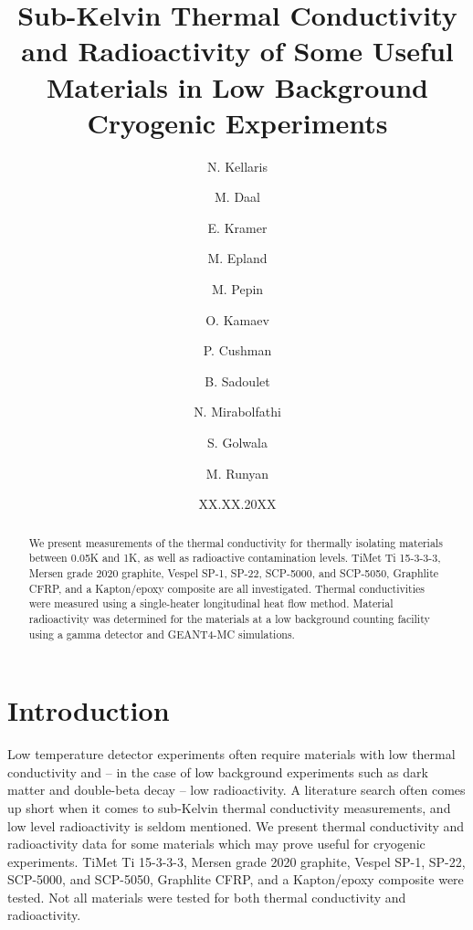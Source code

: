 \documentclass[final]{svjour2}
\begin{document}
\newcommand{\hdblarrow}{H\makebox[0.9ex][l]{$\downdownarrows$}-}
\title{Sub-Kelvin Thermal Conductivity and Radioactivity of Some Useful Materials in Low Background Cryogenic Experiments}

\author{N. Kellaris \and M. Daal \and E. Kramer \and M. Epland \and M. Pepin \and O. Kamaev \and P. Cushman \and B. Sadoulet \and N. Mirabolfathi \and S. Golwala \and M. Runyan}


\date{XX.XX.20XX}

\maketitle


\begin{abstract}
     We present measurements of the thermal conductivity for thermally isolating materials between 0.05K and 1K, as well as radioactive contamination levels. TiMet Ti 15-3-3-3, Mersen grade 2020 graphite, Vespel SP-1, SP-22, SCP-5000, and SCP-5050, Graphlite CFRP, and a Kapton/epoxy composite are all investigated. Thermal conductivities were measured using a single-heater longitudinal heat flow method. Material radioactivity was determined for the materials at a low background counting facility using a gamma detector and GEANT4-MC simulations.



\end{abstract}

\section{Introduction}
Low temperature detector experiments often require materials with low thermal conductivity and -- in the case of low background experiments such as dark matter and double-beta decay -- low radioactivity. A literature search often comes up short when it comes to sub-Kelvin thermal conductivity measurements, and low level radioactivity is seldom mentioned. We present thermal conductivity and radioactivity data for some materials which may prove useful for cryogenic experiments. TiMet Ti 15-3-3-3, Mersen grade 2020 graphite, Vespel SP-1, SP-22, SCP-5000, and SCP-5050, Graphlite CFRP, and a Kapton/epoxy composite were tested. Not all materials were tested for both thermal conductivity and radioactivity.
\end{document}

